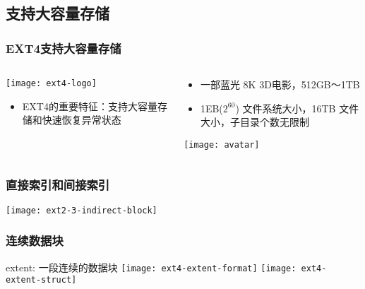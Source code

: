 \subsection{支持大容量存储}
\begin{frame}[fragile]
	\frametitle{EXT4支持大容量存储}
	
	\begin{columns}[t]
		\begin{column}{.3\textwidth}
			
			\texttt{[image: ext4-logo]}
			\begin{itemize}
				\item EXT4的重要特征：支持大容量存储和快速恢复异常状态
				
			\end{itemize}
			
		\end{column}
		
		\begin{column}{.7\textwidth}			
			\begin{itemize}
				\item 一部蓝光 8K 3D电影，512GB～1TB
				\item 1EB($2^{60}$) 文件系统大小，16TB 文件大小，子目录个数无限制
			\end{itemize}
			\texttt{[image: avatar]}
			
		\end{column}
	\end{columns}
	
\end{frame}


\begin{frame}[fragile]
	\frametitle{直接索引和间接索引}
	\centering
    \texttt{[image: ext2-3-indirect-block]}
	
\end{frame}

\begin{frame}[fragile]
	\frametitle{连续数据块}
		\Large
	extent: 一段连续的数据块
\centering
	\texttt{[image: ext4-extent-format]}
	\texttt{[image: ext4-extent-struct]}
\end{frame}


